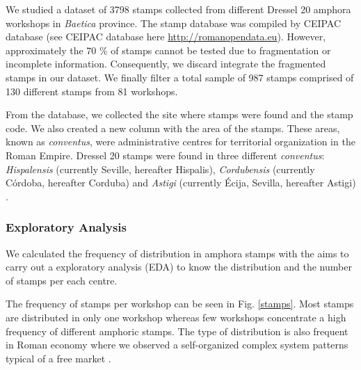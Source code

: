 \documentclass[review]{elsarticle}
\begin{document}
We studied a dataset of 3798 stamps collected from different Dressel 20 amphora workshops in \textit{Baetica} province. The stamp database was compiled by CEIPAC database \citep{remesal_centro_2015} (see CEIPAC database here \url{http://romanopendata.eu}). However, approximately the 70 \% of stamps cannot be tested due to fragmentation or incomplete information. Consequently, we discard integrate the fragmented stamps in our dataset. We finally filter a total sample of 987 stamps comprised of 130 different stamps from 81 workshops. 



From the database, we collected the site where stamps were found and the stamp code. We also created a new column with the area of the stamps. These areas, known as \textit{conventus}, were administrative centres for territorial organization in the Roman Empire. Dressel 20 stamps were found in three different \textit{conventus}: \textit{Hispalensis} (currently Seville, hereafter Hispalis), \textit{Cordubensis} (currently C\'ordoba, hereafter Corduba) and \textit{Astigi} (currently Écija, Sevilla, hereafter Astigi) \citep{rodriguez_economioleicola_1977,
chicdatos2001,berni_millet_epigrafianforica_2008} .


\subsubsection{Exploratory Analysis}

We calculated the frequency of distribution in amphora stamps with the aims to carry out a exploratory analysis (EDA) to know the distribution and the number of stamps per each centre.  

The frequency of stamps per workshop can be seen in Fig. \ref{stamps}. Most stamps are distributed in only one workshop whereas few workshops concentrate a high frequency of different amphoric stamps. The type of distribution is also frequent in Roman economy where we observed a self-organized complex system patterns typical of a free market \citep{bayesian_2018}. 
\end{document}
